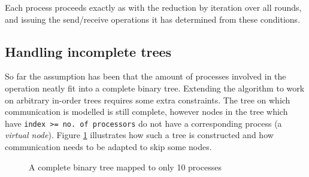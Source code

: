 \documentclass[twoside,twocolumn,hidelinks]{article}
\begin{document}
Each process proceeds exactly as with the reduction by iteration over all rounds, and issuing the send/receive operations it has determined from these conditions.

\subsection{Handling incomplete trees}\label{sec:handling_incomplete}
So far the assumption has been that the amount of processes involved in the operation neatly fit into a complete binary tree. Extending the algorithm to work on arbitrary in-order trees requires some extra constraints. The tree on which communication is modelled is still complete, however nodes in the tree which have \texttt{index >= no. of processors} do not have a corresponding process (a \textit{virtual node}). Figure \ref{fig:tree_missing_processes} illustrates how such a tree is constructed and how communication needs to be adapted to skip some nodes.

\begin{figure}
      \centering
      \caption{A complete binary tree mapped to only 10 processes}
      \label{fig:tree_missing_processes}
\end{figure}
\end{document}
